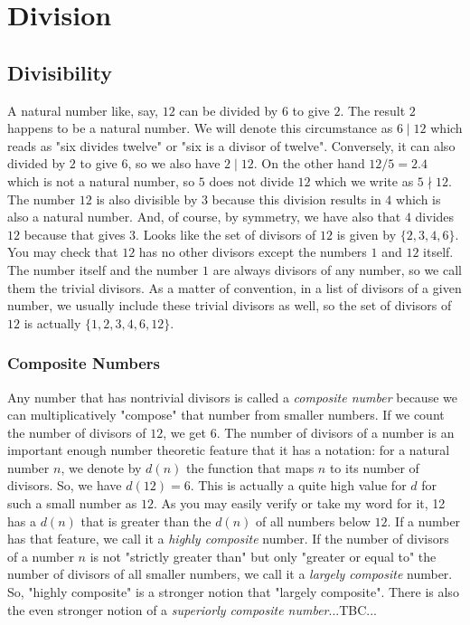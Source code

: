 \section{Division} 

\subsection{Divisibility}
A natural number like, say, $12$ can be divided by $6$ to give $2$. The result $2$ happens to be a natural number. We will denote this circumstance as $6 \mid 12$ which reads as "six divides twelve" or "six is a divisor of twelve". Conversely, it can also divided by $2$ to give $6$, so we also have $2 \mid 12$. On the other hand $12 / 5 = 2.4$ which is not a natural number, so $5$ does not divide $12$ which we write as $5 \nmid 12$. The number $12$ is also divisible by $3$ because this division results in $4$ which is also a natural number. And, of course, by symmetry, we have also that $4$ divides $12$ because that gives $3$. Looks like the set of divisors of $12$ is given by $\{2,3,4,6\}$. You may check that $12$ has no other divisors except the numbers $1$ and $12$ itself. The number itself and the number $1$ are always divisors of any number, so we call them the trivial divisors. As a matter of convention, in a list of divisors of a given number, we usually include these trivial divisors as well, so the set of divisors of $12$ is actually $\{1,2,3,4,6,12\}$. 

\subsubsection{Composite Numbers}
Any number that has nontrivial divisors is called a \emph{composite number} because we can multiplicatively "compose" that number from smaller numbers. If we count the number of divisors of $12$, we get $6$. The number of divisors of a number is an important enough number theoretic feature that it has a notation: for a natural number $n$, we denote by $d(n)$ the function that maps $n$ to its number of divisors. So, we have $d(12) = 6$. This is actually a quite high value for $d$ for such a small number as $12$. As you may easily verify or take my word for it, 12 has a $d(n)$ that is greater than the $d(n)$ of all numbers below $12$. If a number has that feature, we call it a \emph{highly composite} number. If the number of divisors of a number $n$ is not "strictly greater than" but only "greater or equal to" the number of divisors of all smaller numbers, we call it a \emph{largely composite} number. So, "highly composite" is a stronger notion that "largely composite". There is also the even stronger notion of a \emph{superiorly composite number}...TBC...

